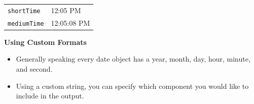 \documentclass[12pt,]{article}
\providecommand{\tightlist}{%
  \setlength{\itemsep}{0pt}\setlength{\parskip}{0pt}}
\begin{document}
\begin{longtable}[c]{@{}ll@{}}
\begin{minipage}[t]{0.20\columnwidth}\raggedright\strut
\texttt{shortTime}
\strut\end{minipage} &
\begin{minipage}[t]{0.37\columnwidth}\raggedright\strut
12:05 PM
\strut\end{minipage}\tabularnewline
\begin{minipage}[t]{0.20\columnwidth}\raggedright\strut
\texttt{mediumTime}
\strut\end{minipage} &
\begin{minipage}[t]{0.37\columnwidth}\raggedright\strut
12:05:08 PM
\strut\end{minipage}\tabularnewline
\bottomrule
\end{longtable}

\textbf{Using Custom Formats}

\begin{itemize}
\tightlist
\item
  Generally speaking every date object has a year, month, day, hour,
  minute, and second.
\item
  Using a custom string, you can specify which component you would like
  to include in the output.
\end{itemize}
\end{document}
